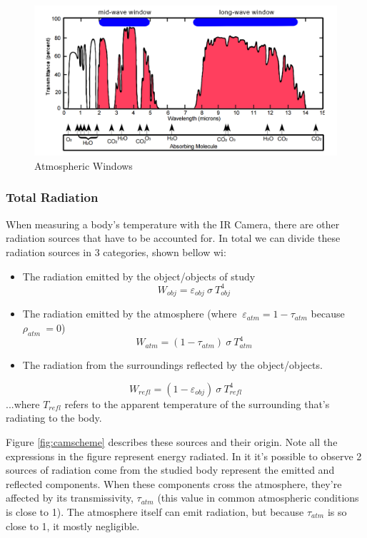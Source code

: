 \begin{figure}
\includegraphics[width=1\linewidth]{Figures/2.Chapter/atmospheric_window.png}
\caption{Atmospheric Windows}
\label{fig:atm}
\end{figure}

\subsubsection{Total Radiation}
\par When measuring a body's temperature with the IR Camera, there are other radiation sources that have to be accounted for. In total we can divide these radiation sources in 3 categories, shown bellow wi:
\begin{itemize}
\item The radiation emitted by the object/objects of study
\begin{equation}
W_{obj}=\varepsilon_{obj} \ \sigma \ T_{obj}^4
\end{equation}
\item The radiation emitted by the atmosphere (where $ \ \varepsilon_{atm}=1-\tau_{atm}$ because $\rho_{atm}~=0$)
\begin{equation}
W_{atm}= (1-\tau_{atm}) \ \sigma \ T_{atm}^4
\end{equation}
\item The radiation from the surroundings reflected by the object/objects.
\end{itemize}
\begin{equation}
W_{refl}=(1-\varepsilon_{obj}) \ \sigma \ T_{refl}^4
\end{equation}
...where $T_{refl}$ refers to the apparent temperature of the surrounding that's radiating to the body.\\
\par Figure \ref{fig:camscheme} describes these sources and their origin. Note all the expressions in the figure represent energy radiated. In it it's possible to observe 2 sources of radiation come from the studied body represent the emitted and reflected components. When these components cross the atmosphere, they're affected by its transmissivity, $\tau_{atm}$ (this value in common atmospheric conditions is close to 1). The atmosphere itself can emit radiation, but because $\tau_{atm}$ is so close to 1, it mostly negligible.\\

